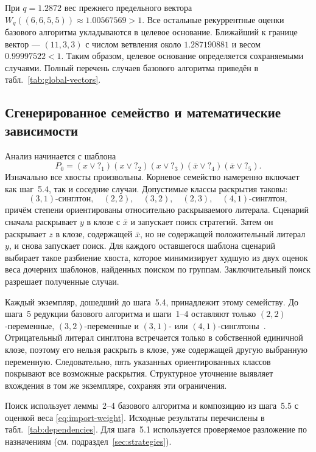\documentclass[10pt,twoside]{article}
\newcommand{\tail}[1]{\mathord{?}_{#1}}
\theoremstyle{definition}
\theoremstyle{remark}
\begin{document}
При $q=1.2872$ вес прежнего предельного вектора
$W_q((6,6,5,5))\approx1.00567569>1$. Все остальные рекуррентные оценки
базового алгоритма укладываются в целевое основание. Ближайший к границе вектор --- $(11,3,3)$ с числом ветвления около $1.287190881$ и
весом $0.99997522<1$. Таким образом, целевое основание определяется
сохраняемыми случаями. Полный перечень случаев базового алгоритма
приведён в табл.~\ref{tab:global-vectors}.

\subsection{Сгенерированное семейство и математические зависимости}
\label{sec:configuration}

Анализ начинается с шаблона
\begin{equation}
 P_0=(x\vee\tail{1})(x\vee\tail{2})(x\vee\tail{3})
     (\bar x\vee\tail{4})(\bar x\vee\tail{5}).
 \label{eq:root}
\end{equation}
Изначально все хвосты произвольны. Корневое семейство намеренно включает
как шаг~5.4, так и соседние случаи. Допустимые классы раскрытия таковы:
\[
 (3,1)\text{-синглтон},\quad (2,2),\quad (3,2),\quad
 (2,3),\quad (4,1)\text{-синглтон},
\]
причём степени ориентированы относительно раскрываемого литерала.
Сценарий сначала раскрывает $y$ в клозе с $\bar x$ и запускает поиск
стратегий. Затем он раскрывает $z$ в клозе, содержащей $\bar x$, но
не содержащей положительный литерал $y$, и снова запускает поиск.
Для каждого оставшегося шаблона сценарий выбирает такое разбиение
хвоста, которое минимизирует худшую из двух оценок веса дочерних
шаблонов, найденных поиском по группам. Заключительный поиск разрешает
полученные случаи.

Каждый экземпляр, дошедший до шага~5.4, принадлежит этому семейству.
До шага~5 редукции базового алгоритма и шаги~1--4 оставляют только
$(2,2)$-переменные, $(3,2)$-переменные и $(3,1)$- или
$(4,1)$-синглтоны~\cite[раздел~4.6]{Xiao2022}. Отрицательный литерал
синглтона встречается только в собственной единичной клозе, поэтому его
нельзя раскрыть в клозе, уже содержащей другую выбранную переменную.
Следовательно, пять указанных ориентированных классов покрывают все
возможные раскрытия. Структурное уточнение выявляет вхождения в том же
экземпляре, сохраняя эти ограничения.

Поиск использует леммы~2--4 базового алгоритма и композицию из
шага~5.5 с оценкой веса \eqref{eq:import-weight}. Исходные результаты
перечислены в табл.~\ref{tab:dependencies}. Для шага~5.1 используется
проверяемое разложение по назначениям (см. подраздел~\ref{sec:strategies}).
\end{document}
